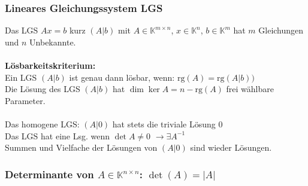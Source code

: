 \documentclass[6pt,a4paper]{scrartcl}
\begin{document}
\begin{multicols}{4}
\subsubsection{Lineares Gleichungssystem LGS}
Das LGS $Ax=b$ kurz $(A|b)$ mit $A\in \mathbb K^{m\times n}$, $x\in \mathbb K^n$, $b\in \mathbb K^m$ hat $m$ Gleichungen und $n$ Unbekannte.\\
\\
\textbf{Lösbarkeitskriterium:}\\
Ein LGS $(A|b)$ ist genau dann lösbar, wenn: $\mathrm{rg}(A)=\mathrm{rg}(A|b))$\\
Die Lösung des LGS $(A|b)$ hat $\dim{\ker A} = n-\mathrm{rg}(A)$ frei wählbare Parameter.\\
\\
Das homogene LGS: $(A|0)$ hat stets die triviale Lösung $0$\\
Das LGS hat eine Lsg. wenn $\det A \not= 0$ \quad $\rightarrow \exists A^{-1}$ \\
Summen und Vielfache der Lösungen von $(A|0)$ sind wieder Lösungen.

\subsubsection{Determinante von $A\in \mathbb K^{n\times n}$: $\det(A)=|A|$}


\end{multicols}
\end{document}
